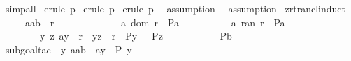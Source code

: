 \begin{isabellebody}
\isamarkupfalse%
\ simp{\isacharunderscore}all\isanewline
{}\isamarkupfalse%
\ {\isacharparenleft}erule\ p{}{\isacharparenright}\isanewline
{}\isamarkupfalse%
\ {\isacharparenleft}erule\ p{}{\isacharparenright}\isanewline
{}\isamarkupfalse%
\ {\isacharparenleft}erule\ p{}{\isacharparenright}\ \isanewline
{}\isamarkupfalse%
\ {\isacharparenleft}assumption{\isacharparenright}\ \isanewline
{}\isamarkupfalse%
\ {\isacharparenleft}assumption{\isacharparenright}\isanewline
{}\isamarkupfalse%
%
\endisatagproof
{\isafoldproof}%
%
\isadelimproof
\isanewline
%
\endisadelimproof
\isanewline
\isanewline
\isanewline
{}\isamarkupfalse%
\ zrtrancl{\isacharunderscore}induct{\isacharcolon}\isanewline
\ \ \ \ {\isachardoublequoteopen}{\isacharbrackleft}{\isacharbar}\ {\isacharparenleft}a{\isacharcolon}{\isacharcolon}{\isacharprime}a{\isacharcomma}b{\isacharparenright}\ {\isacharcolon}\ r{\isacharpercent}{\isacharasterisk}{\isacharsemicolon}\ \ \ \ \ \isanewline
\ \ \ \ \ \ \ \ a{\isacharcolon}\ dom\ r\ {\isacharequal}{\isacharequal}{\isachargreater}\ P{\isacharparenleft}a{\isacharparenright}{\isacharsemicolon}\ \ \isanewline
\ \ \ \ \ \ \ \ a{\isacharcolon}\ ran\ r\ {\isacharequal}{\isacharequal}{\isachargreater}\ P{\isacharparenleft}a{\isacharparenright}{\isacharsemicolon}\ \ \isanewline
\ \ \ \ \ \ \ \ {\isacharbang}{\isacharbang}y\ z{\isachardot}{\isacharbrackleft}{\isacharbar}\ {\isacharparenleft}a{\isacharcomma}y{\isacharparenright}\ {\isacharcolon}\ r{\isacharpercent}{\isacharasterisk}{\isacharsemicolon}\ \ {\isacharparenleft}y{\isacharcomma}z{\isacharparenright}\ {\isacharcolon}\ r{\isacharsemicolon}\ \ P{\isacharparenleft}y{\isacharparenright}\ {\isacharbar}{\isacharbrackright}\ {\isacharequal}{\isacharequal}{\isachargreater}\ P{\isacharparenleft}z{\isacharparenright}\ {\isacharbar}{\isacharbrackright}\ \ \ \isanewline
\ \ \ \ \ \ {\isacharequal}{\isacharequal}{\isachargreater}\ P{\isacharparenleft}b{\isacharparenright}{\isachardoublequoteclose}\isanewline
%
\isadelimproof
\isanewline
%
\endisadelimproof
%
\isatagproof
{}\isamarkupfalse%
\ {\isacharparenleft}subgoal{\isacharunderscore}tac\ {\isachardoublequoteopen}{\isacharbang}\ y{\isachardot}\ {\isacharparenleft}a{\isacharcolon}{\isacharcolon}{\isacharprime}a{\isacharcomma}b{\isacharparenright}\ {\isacharequal}\ {\isacharparenleft}a{\isacharcomma}y{\isacharparenright}\ {\isacharminus}{\isacharminus}{\isachargreater}\ P\ {\isacharparenleft}y{\isacharparenright}\ {\isachardoublequoteclose}{\isacharparenright}\isanewline

\end{isabellebody}
